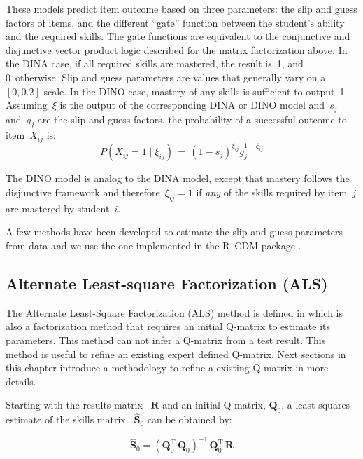 These models predict item outcome based on three parameters: the slip and guess factors of items, and the different ``gate'' function between the student's ability and the required skills.  The gate functions are equivalent to the conjunctive and disjunctive vector product logic described for the matrix factorization above.  In the DINA case, if all required skills are mastered, the result is~1, and 0~otherwise. Slip and guess parameters are values that generally vary on a~$[0,0.2]$ scale. In the DINO case, mastery of any skills is sufficient to output~1.  Assuming~$\xi$ is the output of the corresponding DINA or DINO model and~$s_j$ and~$g_j$ are the slip and guess factors, the probability of a successful outcome to item~$X_{ij}$ is:
\begin{equation}
 P(X_{ij} \!=\! 1 \; | \; \xi_{ij}) \,=\, (1-s_j)^{\xi_{ij}} g_j^{1-\xi_{ij}}
\label{DinoEQ}
\end{equation}

The DINO model is analog to the DINA model, except that mastery follows the disjunctive framework and therefore~$\xi_{ij}=1$ if \textit{any} of the skills required by item~$j$ are mastered by student~$i$.

A few methods have been developed to estimate the slip and guess parameters from data and we use the one implemented in the R~CDM package \citep{Robitzsch2012}.

\subsection{Alternate Least-square Factorization (ALS)}
\label{ALS-Def}

The {Alternate Least-Square Factorization (ALS)} method is defined in \cite{Desmarais2013aied} which is also a factorization method that requires an initial Q-matrix to estimate its parameters. This method can not infer a Q-matrix from a test result. This method is useful to refine an existing expert defined Q-matrix. Next sections in this chapter introduce a methodology to refine a existing Q-matrix in more details.

Starting with the results matrix ~$\mathbf{R}$ and an initial Q-matrix, $\mathbf{Q}_0$, a least-squares estimate of the skills matrix ~$\mathbf{\hat{S}}_0$ can be obtained by:

\[
  \mathbf{\hat{S}}_0 = (\mathbf{Q}_0^{\mathrm{T}}  \, \mathbf{Q}_0)^{-1} \, \mathbf{Q}_0^{\mathrm{T}} \, \mathbf{R} \label{eq:shat}
\]

